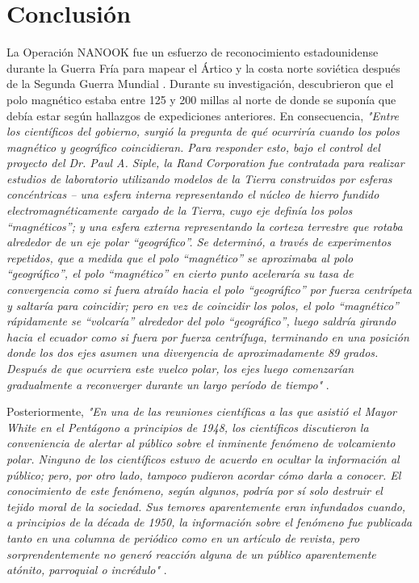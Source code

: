 \documentclass[10pt,twocolumn,letterpaper]{article}
\begin{document}
\section{Conclusión}

La Operación NANOOK fue un esfuerzo de reconocimiento estadounidense durante la Guerra Fría para mapear el Ártico y la costa norte soviética después de la Segunda Guerra Mundial \cite{137}. Durante su investigación, descubrieron que el polo magnético estaba entre 125 y 200 millas al norte de donde se suponía que debía estar según hallazgos de expediciones anteriores. En consecuencia, \textit{"Entre los científicos del gobierno, surgió la pregunta de qué ocurriría cuando los polos magnético y geográfico coincidieran. Para responder esto, bajo el control del proyecto del Dr. Paul A. Siple, la Rand Corporation fue contratada para realizar estudios de laboratorio utilizando modelos de la Tierra construidos por esferas concéntricas – una esfera interna representando el núcleo de hierro fundido electromagnéticamente cargado de la Tierra, cuyo eje definía los polos “magnéticos”; y una esfera externa representando la corteza terrestre que rotaba alrededor de un eje polar “geográfico”. Se determinó, a través de experimentos repetidos, que a medida que el polo “magnético” se aproximaba al polo “geográfico”, el polo “magnético” en cierto punto aceleraría su tasa de convergencia como si fuera atraído hacia el polo “geográfico” por fuerza centrípeta y saltaría para coincidir; pero en vez de coincidir los polos, el polo “magnético” rápidamente se “volcaría” alrededor del polo “geográfico”, luego saldría girando hacia el ecuador como si fuera por fuerza centrífuga, terminando en una posición donde los dos ejes asumen una divergencia de aproximadamente 89 grados. Después de que ocurriera este vuelco polar, los ejes luego comenzarían gradualmente a reconverger durante un largo período de tiempo"} \cite{138,139}.

Posteriormente, \textit{"En una de las reuniones científicas a las que asistió el Mayor White en el Pentágono a principios de 1948, los científicos discutieron la conveniencia de alertar al público sobre el inminente fenómeno de volcamiento polar. Ninguno de los científicos estuvo de acuerdo en ocultar la información al público; pero, por otro lado, tampoco pudieron acordar cómo darla a conocer. El conocimiento de este fenómeno, según algunos, podría por sí solo destruir el tejido moral de la sociedad. Sus temores aparentemente eran infundados cuando, a principios de la década de 1950, la información sobre el fenómeno fue publicada tanto en una columna de periódico como en un artículo de revista, pero sorprendentemente no generó reacción alguna de un público aparentemente atónito, parroquial o incrédulo"} \cite{138,139}.
\end{document}

